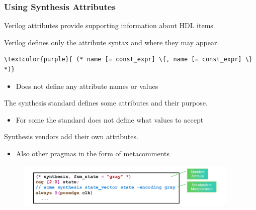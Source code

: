 \documentclass[t, notes, xcolor=table]{beamer}
\begin{document}
\begin{frame}[fragile]
\frametitle{Using Synthesis Attributes}
\footnotesize{
Verilog attributes provide supporting information about HDL items.

Verilog defines only the attribute syntax and where they may appear.

\begin{Verbatim}[commandchars=\\\{\}, tabsize=2]
\textcolor{purple}{	(* name [= const_expr] \{, name [= const_expr] \} *)}
\end{Verbatim}
\begin{itemize}
\item Does not define any attribute names or values
\end{itemize}

The synthesis standard defines some attributes and their purpose.
\begin{itemize}
\item For some the standard does not define what values to accept
\end{itemize}

Synthesis vendors add their own attributes.
\begin{itemize}
\item Also other pragmas in the form of metacomments
\end{itemize}
}
\begin{figure}
    \includegraphics[width=0.95\textwidth]{img/13_attributes.png}
\end{figure}
\end{frame}
\end{document}
